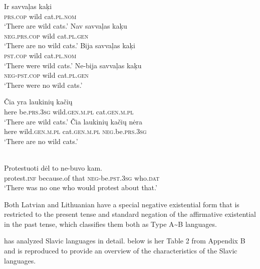 \documentclass[output=paper]{langsci/langscibook}
\begin{document}
\begin{exe}\ex
{}
\begin{xlist}
\ex \gll Ir savvaļas  kaķi \\
\textsc{prs.cop} wild cat.\textsc{pl.nom} \\
    \glt `There are wild cats.'
\ex\label{ex:ieur-latvian-nowildcatsnow}
\gll Nav savvaļas kaķu\\
\textsc{neg.prs.cop} wild cat.\textsc{pl.gen}\\
    \glt `There are no wild cats.'
\ex
\gll Bija      savvaļas kaķi\\
\textsc{pst.cop} wild cat.\textsc{pl.nom}\\
    \glt `There were wild cats.'
\ex\label{ex:ieur-latvian-nowildcatspast}
\gll   Ne-bija savvaļas kaķu\\
\textsc{neg}-\textsc{pst}.\textsc{cop} wild cat.\textsc{pl}.\textsc{gen}\\
    \glt `There were no wild cats.'
\end{xlist}
\ex{}
\begin{xlist}
\ex\gll Čia yra laukinių kačių \\
here be.\textsc{prs.3sg} wild.\textsc{gen.m.pl} cat.\textsc{gen.m.pl}
\\
    \glt `There are wild cats.'
\ex\label{ex:ieur-lithuanian-nowildcatsnow}
\gll Čia  laukinių kačių nėra\\
here wild.\textsc{gen.m.pl} cat.\textsc{gen.m.pl}
\textsc{neg}.be.\textsc{prs.3sg}\\
    \glt `There are no wild cats.'
\end{xlist}
\ex\label{ex:ieur-lithuanian-noprotest}
\\
    \gll Protestuoti dėl to ne-buvo kam.  \\
protest.\textsc{inf} because.of that
\textsc{neg}-be.\textsc{pst.3sg} who.\textsc{dat}\\
    \glt `There was no one who would protest about that.' 
\end{exe}
%
Both Latvian and Lithuanian have a special negative existential form that is restricted to the present tense and standard negation of the affirmative existential in the past tense, which classifies them both as Type A{\textasciitilde}B languages. 

\citet{Veselinova2014} has analyzed Slavic languages in detail.
 below is her Table 2 from Appendix B and is reproduced to
provide an overview of the characteristics of the Slavic languages.
\end{document}
